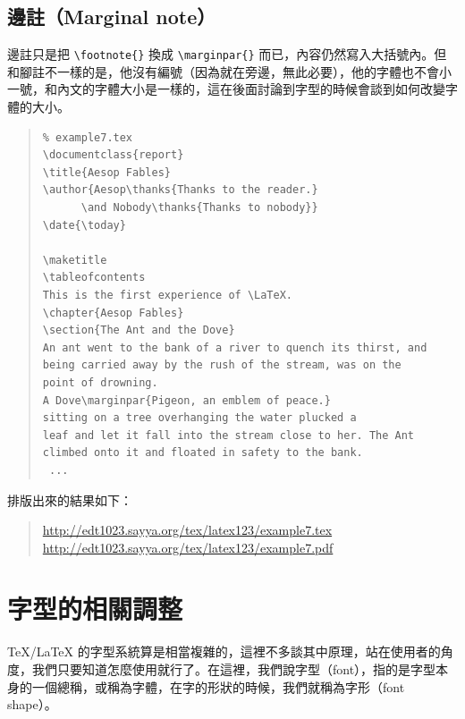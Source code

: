 \subsection{邊註（Marginal note）}

邊註只是把 \verb|\footnote{}| 換成 \verb|\marginpar{}| 而已，內容仍然寫入大括號內。但和腳註不一樣的是，他沒有編號（因為就在旁邊，無此必要），他的字體也不會小一號，和內文的字體大小是一樣的，這在後面討論到字型的時候會談到如何改變字體的大小。

\begin{quote}
   \begin{verbatim}
% example7.tex
\documentclass{report}
\title{Aesop Fables}
\author{Aesop\thanks{Thanks to the reader.}
      \and Nobody\thanks{Thanks to nobody}}
\date{\today}

\maketitle
\tableofcontents
This is the first experience of \LaTeX.
\chapter{Aesop Fables}
\section{The Ant and the Dove}
An ant went to the bank of a river to quench its thirst, and
being carried away by the rush of the stream, was on the
point of drowning.
A Dove\marginpar{Pigeon, an emblem of peace.}
sitting on a tree overhanging the water plucked a
leaf and let it fall into the stream close to her. The Ant
climbed onto it and floated in safety to the bank.
 ...
\end{verbatim}
\end{quote}

排版出來的結果如下：

\begin{quote}
   \url{http://edt1023.sayya.org/tex/latex123/example7.tex}\\
   \url{http://edt1023.sayya.org/tex/latex123/example7.pdf}
\end{quote}

\section{字型的相關調整}

\TeX/\LaTeX{} 的字型系統算是相當複雜的，這裡不多談其中原理，站在使用者的角度，我們只要知道怎麼使用就行了。在這裡，我們說字型（font），指的是字型本身的一個總稱，或稱為字體，在字的形狀的時候，我們就稱為字形（font shape）。


